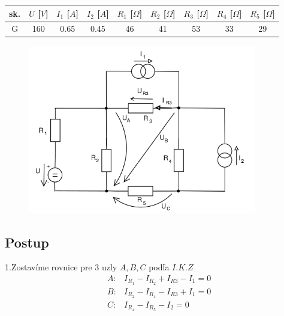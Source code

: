 \documentclass[a4paper,oneside,12pt]{article}
\begin{document}
\begin{table}[h]
		\begin{center}		
			\begin{tabular}{|c|c|c|c|c|c|c|c|c|}
					\hline
					sk. & $U$ [$V$] & $I_{1}$ [$A$] & $I_{2}$ [$A$] & $R_{1}$ [$\Omega$] &  $R_{2}$ [$\Omega$] & $R_{3}$ [$\Omega$] & $R_{4}$ [$\Omega$] & $R_{5}$ [$\Omega$] \\
					\hline
					G & 160 & 0.65 & 0.45 & 46 & 41 & 53 & 33 & 29  \\
					\hline
			\end{tabular}
		\end{center}
	\end{table}

\begin{figure}[h]
		\begin{center}
			\includegraphics[width=10cm]{circuit_3.png}
		\end{center}
\end{figure}

\maketitle
\subsection{Postup}

1.Zostavíme rovnice pre 3 uzly $A, B, C$ podľa $I.K.Z$
\begin{eqnarray*}
	&A: & I_{R_{1}} - I_{R_{2}} + I_{R{3}} - I_{1} = 0 \\
	&B: & I_{R_{2}} - I_{R_{4}} - I_{R{3}} + I_{1} = 0 \\
	&C: & I_{R_{4}} - I_{R_{5}} - I_{2} = 0 \\
\end{eqnarray*}
\end{document}
